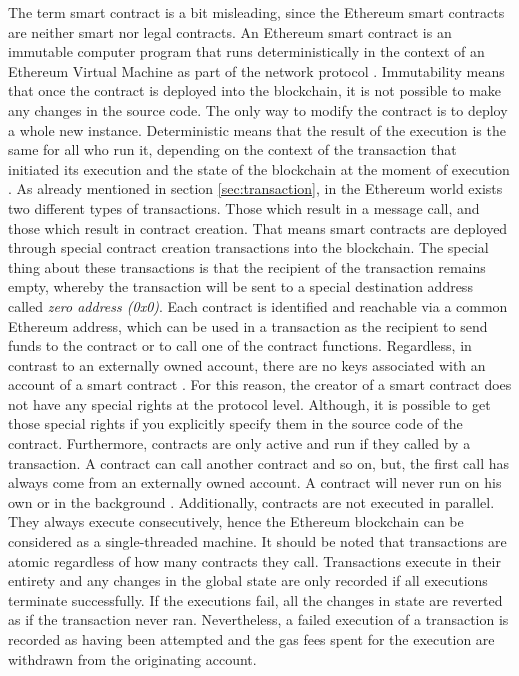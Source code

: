 The term smart contract is a bit misleading, since the Ethereum smart contracts 
are neither smart nor legal contracts.
An Ethereum smart contract is an immutable computer program that runs deterministically in the context of an
Ethereum Virtual Machine as part of the network protocol .
Immutability means that once the contract is deployed into the blockchain, it is not possible to make any
changes in the source code. The only way to modify the contract is to deploy a whole new instance. 
Deterministic means that the result of the execution is the same for all who run it, 
depending on the context of the transaction that initiated its execution and the state of the blockchain
at the moment of execution .
As already mentioned in section \ref{sec:transaction}, in the Ethereum world exists two different types of transactions.
Those which result in a message call, and those which result in contract creation. 
That means smart contracts are deployed through special contract creation transactions into the blockchain. 
The special thing about these transactions is that the recipient of the transaction remains empty, whereby the transaction
will be sent to a special destination address called \textit{zero address (0x0)}. Each contract is identified and reachable via
a common Ethereum address, which can be used in a transaction as the recipient to send funds to the contract or to call 
one of the contract functions. Regardless, in contrast to an externally owned account, there are no keys associated with 
an account of a smart contract . For this reason, the creator of a smart contract does not have any special rights at the 
protocol level. Although, it is possible to get those special rights if you explicitly 
specify them in the source code of the contract.
Furthermore, contracts are only active and run if they called by a transaction. 
A contract can call another contract and so on, but, 
the first call has always come from an externally owned account. 
A contract will never run on his own or in the background . Additionally, contracts are not executed in parallel.
They always execute consecutively, hence the Ethereum blockchain can be considered as a single-threaded machine. 
It should be noted that transactions are atomic regardless of how many contracts they call. Transactions execute in
their entirety and any changes in the global state are only recorded if all executions terminate successfully. 
If the executions fail, all the changes in state are reverted as if the transaction never ran. Nevertheless, a failed
execution of a transaction is recorded as having been attempted and the gas fees spent for the execution are withdrawn
from the originating account.

\clearpage